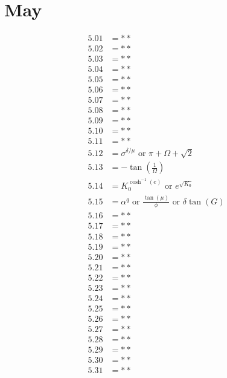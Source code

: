 \documentclass[12pt]{article}
\newcommand{\oder}{\text{ or }}
\begin{document}
\section{May}
\begin{align*}
5.01 &= **\\
5.02 &= **\\
5.03 &= **\\
5.04 &= **\\
5.05 &= **\\
5.06 &= **\\
5.07 &= **\\
5.08 &= **\\
5.09 &= **\\
5.10 &= **\\
5.11 &= **\\
5.12 &= \sigma^{\delta / \mu} \oder \pi + \Omega + \sqrt{2}\\
5.13 &= -\tan\left(\frac{1}{\Omega}\right)\\
5.14 &= K_{0}^{\cosh^{-1}(e)} \oder e^{\sqrt{K_{0}}}\\
5.15 &= \alpha^{q} \oder \frac{\tan(\mu)}{\phi} \oder \delta\tan(G)\\
5.16 &= **\\
5.17 &= **\\
5.18 &= **\\
5.19 &= **\\
5.20 &= **\\
5.21 &= **\\
5.22 &= **\\
5.23 &= **\\
5.24 &= **\\
5.25 &= **\\
5.26 &= **\\
5.27 &= **\\
5.28 &= **\\
5.29 &= **\\
5.30 &= **\\
5.31 &= **\\
\end{align*}

\pagebreak
\end{document}
